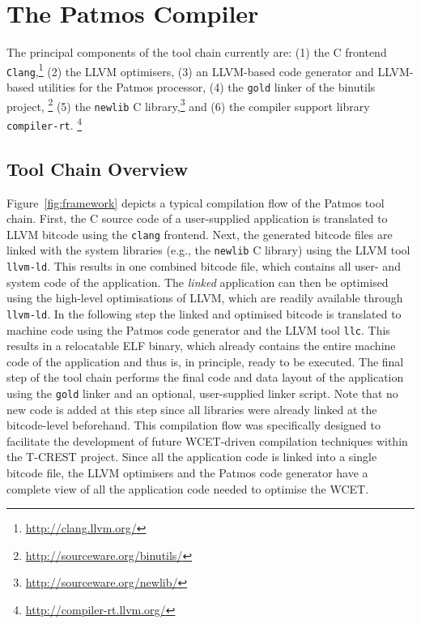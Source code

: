 \section{The Patmos Compiler}
\label{sec:the_patmos_compiler}

The principal components of the tool chain currently are:
(1) the C frontend \texttt{Clang},\footnote{\url{http://clang.llvm.org/}} (2)
the LLVM optimisers, (3) an LLVM-based code generator and LLVM-based utilities
for the Patmos processor, (4) the \texttt{gold} linker of the binutils project,%
\footnote{\url{http://sourceware.org/binutils/}} (5) the \texttt{newlib} C
library,\footnote{\url{http://sourceware.org/newlib/}} and (6) the compiler
support library \texttt{compiler-rt}.%
\footnote{\url{http://compiler-rt.llvm.org/}}

\subsection{Tool Chain Overview}
\label{sec:toolchain_overview}

Figure~\ref{fig:framework} depicts a typical compilation flow of the Patmos
tool chain. First, the C source code of a user-supplied application is
translated to LLVM bitcode using the \texttt{clang} frontend. Next, the
generated bitcode files are linked with the system libraries (e.g., the 
\texttt{newlib} C library) using the LLVM tool \texttt{llvm-ld}. This results in
one combined bitcode file, which contains all user- and system code of the
application. The \emph{linked} application can then be optimised using the
high-level optimisations of LLVM, which are readily available through
\texttt{llvm-ld}. In the following step the linked and optimised bitcode is
translated to machine code using the Patmos code generator and the LLVM tool
\texttt{llc}. This results in a relocatable ELF binary, which already contains
the entire machine code of the application and thus is, in principle, ready to
be executed. The final step of the tool chain performs the final code and data
layout of the application using the \texttt{gold} linker and an optional,
user-supplied linker script. Note that no new code is added at this step since
all libraries were already linked at the bitcode-level beforehand. This
compilation flow was specifically designed to facilitate the development of
future WCET-driven compilation techniques within the T-CREST project. Since all
the application code is linked into a single bitcode file, the LLVM optimisers
and the Patmos code generator have a complete view of all the application code
needed to optimise the WCET.


